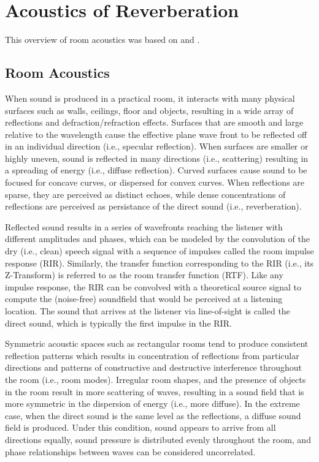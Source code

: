 \section{Acoustics of Reverberation}

This overview of room acoustics was based on \cite{beranek2012acoustics} and \cite{kuttruff2016room}.

\subsection{Room Acoustics}

When sound is produced in a practical room, it interacts with many physical surfaces such as walls, ceilings, floor and objects, resulting in a wide array of reflections and defraction/refraction effects. Surfaces that are smooth and large relative to the wavelength cause the effective plane wave front to be reflected off in an individual direction (i.e., specular reflection). When surfaces are smaller or highly uneven, sound is reflected in many directions (i.e., scattering) resulting in a spreading of energy (i.e., diffuse reflection). Curved surfaces cause sound to be focused for concave curves, or dispersed for convex curves. When reflections are sparse, they are perceived as distinct echoes, while dense concentrations of reflections are perceived as persistance of the direct sound (i.e., reverberation). 

Reflected sound results in a series of wavefronts reaching the listener with different amplitudes and phases, which can be modeled by the convolution of the dry (i.e., clean) speech signal with a sequence of impulses called the room impulse response (RIR). Similarly, the transfer function corresponding to the RIR (i.e., its Z-Transform) is referred to as the room transfer function (RTF). Like any impulse response, the RIR can be convolved with a theoretical source signal to compute the (noise-free) soundfield that would be perceived at a listening location. The sound that arrives at the listener via line-of-sight is called the direct sound, which is typically the first impulse in the RIR.

Symmetric acoustic spaces such as rectangular rooms tend to produce consistent reflection patterns which results in concentration of reflections from particular directions and patterns of constructive and destructive interference throughout the room (i.e., room modes). Irregular room shapes, and the presence of objects in the room result in more scattering of waves, resulting in a sound field that is more symmetric in the dispersion of energy (i.e., more diffuse). In the extreme case, when the direct sound is the same level as the reflections, a diffuse sound field is produced. Under this condition, sound appears to arrive from all directions equally, sound pressure is distributed evenly throughout the room, and phase relationships between waves can be considered uncorrelated.


